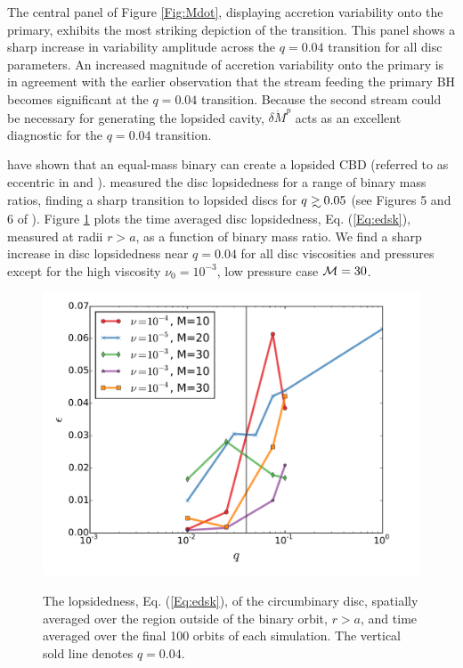 The central panel of Figure \ref{Fig:Mdot}, displaying accretion
variability onto the primary, exhibits the most striking depiction of
the transition. This panel shows a sharp increase in variability
amplitude across the $q=0.04$ transition for all disc parameters. An
increased magnitude of accretion variability onto the primary is in
agreement with the earlier observation that the stream feeding the
primary BH becomes significant at the $q=0.04$ transition. Because the
second stream could be necessary for generating the lopsided cavity,
$\delta \dot{M}^p$ acts as an excellent diagnostic for the $q=0.04$
transition.




\cite{MacFadyen:2008, ShiKrolik:2012:ApJ, Noble+2012, DHM:2013:MNRAS,
  Farris:2014,Farris:2015:Cool,Farris:2015:GW, ShiKrolik:2015} have
shown that an equal-mass binary can create a lopsided CBD (referred to
as eccentric in \cite{MacFadyen:2008} and
\cite{Farris:2014}). \cite{Farris:2014} measured the disc lopsidedness
for a range of binary mass ratios, finding a sharp transition to
lopsided discs for $q\gsim0.05$ (see Figures 5 and 6 of
\citealt{Farris:2014}). Figure \ref{Fig:edsk} plots the time averaged
disc lopsidedness, Eq. (\ref{Eq:edsk}), measured at radii $r>a$, as a
function of binary mass ratio. We find a sharp increase in disc
lopsidedness near $q=0.04$ for all disc viscosities and pressures
except for the high viscosity $\nu_0=10^{-3}$, low pressure case
$\mathcal{M}=30$.


\begin{figure}
\begin{center}
\includegraphics[scale=0.4]{figures/ch2/edsk1_100.pdf} \\
\end{center}
\caption{The lopsidedness, Eq. (\ref{Eq:edsk}), of the circumbinary
  disc, spatially averaged over the region outside of the binary
  orbit, $r>a$, and time averaged over the final 100 orbits of each
  simulation. The vertical sold line denotes $q=0.04$.}
\label{Fig:edsk}
\end{figure}

